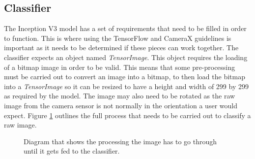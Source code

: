 \documentclass[12pt,a4paper]{report}
\begin{document}
\par

\subsection{Classifier}

The Inception V3 model has a set of requirements that need to be filled in order to function. This is where using the 
TensorFlow and CameraX guidelines is important as it needs to be determined if these pieces can work together. 
The classifier expects 
an object named \emph{TensorImage}. This object requires the loading of a bitmap image in order to be valid. This means that
some pre-processing must be carried out to convert an image into a bitmap, to then load the bitmap into a \emph{TensorImage} so it can 
 be resized to have a height and width of 299 by 299 as required by the model.  The image may also need to be rotated
as the raw image from the camera sensor is not normally in the orientation a user would expect.
Figure \ref{fig:classify} outlines the full process that needs to be carried out to classify a raw image.

\begin{figure}[h]
    \centering

    \caption{Diagram that shows the processing the image has to go through until it gets fed to the classifier.}
    \label{fig:classify}
\end{figure}
\end{document}
